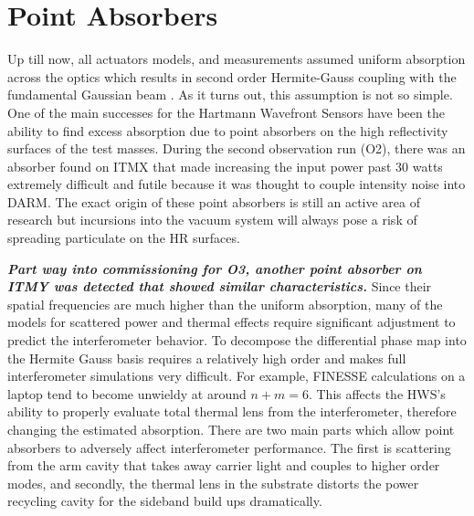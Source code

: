 \section{Point Absorbers}\label{sec:point_absorbers}
	Up till now, all actuators models, and measurements assumed uniform absorption across the optics which results in second order Hermite-Gauss coupling with the fundamental Gaussian beam .  As it turns out, this assumption is not so simple. One of the main successes for the Hartmann Wavefront Sensors have been the ability to find excess absorption due to point absorbers on the high reflectivity surfaces of the test masses.  During the second observation run (O2), there was an absorber found on ITMX that made increasing the input power past 30 watts extremely difficult and futile because it was thought to couple intensity noise into DARM. The exact origin of these point absorbers is still an active area of research but incursions into the vacuum system will always pose a risk of spreading particulate on the HR surfaces.

	\textbf{\emph{Part way into commissioning for O3, another point absorber on ITMY was detected that showed similar characteristics.}}  Since their spatial frequencies are much higher than the uniform absorption, many of the models for scattered power and thermal effects require significant adjustment to predict the interferometer behavior.  To decompose the differential phase map into the Hermite Gauss basis requires a relatively high order and makes full interferometer simulations very difficult.  For example, FINESSE calculations on a laptop tend to become unwieldy at around $n+m = 6$.  This affects the HWS's ability to properly evaluate total thermal lens from the interferometer, therefore changing the estimated absorption.  There are two main parts which allow point absorbers to adversely affect interferometer performance.   The first is scattering from the arm cavity that takes away carrier light and couples to higher order modes, and secondly, the thermal lens in the substrate distorts the power recycling cavity for the sideband build ups dramatically.
	

